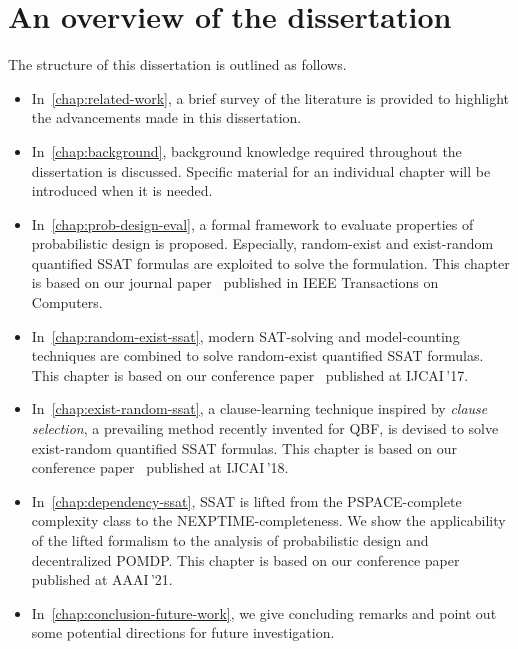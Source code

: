 \section{An overview of the dissertation}
The structure of this dissertation is outlined as follows.
\begin{itemize}
      \item
            In~\cref{chap:related-work}, a brief survey of the literature is provided to highlight the advancements made in this dissertation.
      \item
            In~\cref{chap:background}, background knowledge required throughout the dissertation is discussed.
            Specific material for an individual chapter will be introduced when it is needed.
      \item
            In~\cref{chap:prob-design-eval}, a formal framework to evaluate properties of probabilistic design is proposed.
            Especially, random-exist and exist-random quantified SSAT formulas are exploited to solve the formulation.
            This chapter is based on our journal paper~\cite{LeeTC18ProbDesign} published in IEEE Transactions on Computers.
      \item
            In~\cref{chap:random-exist-ssat}, modern SAT-solving and model-counting techniques are combined to solve random-exist quantified SSAT formulas.
            This chapter is based on our conference paper~\cite{LeeIJCAI17RESSAT} published at IJCAI\,'17.
      \item
            In~\cref{chap:exist-random-ssat}, a clause-learning technique inspired by \textit{clause selection}, a prevailing method recently invented for QBF, is devised to solve exist-random quantified SSAT formulas.
            This chapter is based on our conference paper~\cite{LeeIJCAI18ERSSAT} published at IJCAI\,'18.
      \item
            In~\cref{chap:dependency-ssat}, SSAT is lifted from the PSPACE-complete complexity class to the NEXPTIME-completeness.
            We show the applicability of the lifted formalism to the analysis of probabilistic design and decentralized POMDP.
            This chapter is based on our conference paper~\cite{LeeAAAI21DSSAT} published at AAAI\,'21.
      \item
            In~\cref{chap:conclusion-future-work}, we give concluding remarks and point out some potential directions for future investigation.
\end{itemize}
